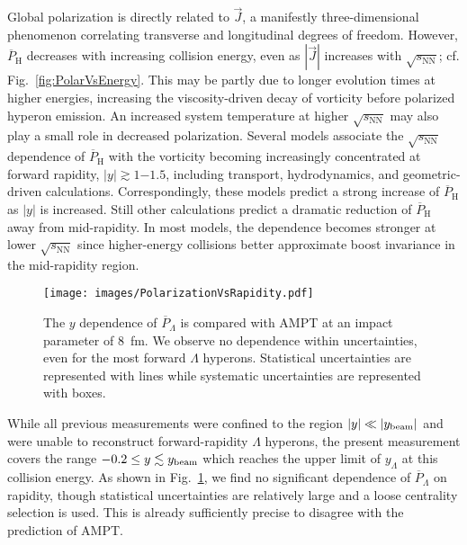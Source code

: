 \documentclass[
  reprint,
  superscriptaddress,
  amsmath,
  amssymb,
  aps,
  floatfix,
]{revtex4-2}
\newcommand{\sNN}{\sqrt{s_\mathrm{NN}}}
\newcommand{\Jsys}{\vec{J}}
\newcommand{\PLambda}{\overline{P}_{\Lambda}}
\newcommand{\PHyper}{\overline{P}_\mathrm{H}}
\begin{document}
Global polarization is directly related to
 $\Jsys$, a manifestly three-dimensional phenomenon correlating
 transverse and longitudinal degrees of freedom.
 However, $\PHyper$ decreases with increasing collision
 energy, even as $|\Jsys|$ increases with
 $\sNN$; cf. Fig.~\ref{fig:PolarVsEnergy}. This may be
 partly due to longer evolution times
 at higher energies, increasing the viscosity-driven
 decay of vorticity before polarized hyperon
 emission\cite{Karpenko:2017lyj}. An increased system temperature at
 higher $\sNN$ may also play a
 small role in decreased polarization\cite{Wang:2013xtp}. Several
 models associate the $\sNN$ dependence of
 $\PHyper$ with the vorticity becoming increasingly
 concentrated at forward rapidity, $|y|\gtrsim1\mathrm{-}1.5$, 
 including transport\cite{Jiang:2016woz},
 hydrodynamics\cite{Ivanov:2018eej,Wu:2019eyi,Ivanov:2019ern,Ivanov:2020wak},
 and geometric-driven calculations\cite{Liang:2019pst}. 
 Correspondingly, these
 models predict a strong increase of
 $\PHyper$ as $|y|$ is increased. Still
 other calculations predict a dramatic reduction
 of $\PHyper$ away from mid-rapidity\cite{Deng:2016gyh,Wei:2018zfb,Xie:2019jun}. In
 most models, the dependence becomes stronger
 at lower $\sNN$ since higher-energy collisions
 better approximate boost invariance in the
 mid-rapidity region. 

\begin{figure}[t]
  \centering
  \texttt{[image: images/PolarizationVsRapidity.pdf]}
  \caption{The $y$ dependence of $\PLambda$
 is compared with AMPT\cite{guo2021locating} at an
 impact parameter of 8~fm. We
 observe no dependence within uncertainties, even
 for the most forward $\Lambda$ hyperons.
 Statistical uncertainties are represented with lines
 while systematic uncertainties are represented with
 boxes.}
  \label{fig:y}
\end{figure}

While all previous measurements were confined
 to the region $|y|\ll|y_{\rm beam}|$ and
 were unable to reconstruct forward-rapidity $\Lambda$
 hyperons, the present measurement covers the
 range $-0.2\leq y\lesssim y_{\rm beam}$
 which reaches
 the upper limit of $y_\Lambda$ at
 this collision energy. As shown in
 Fig.~\ref{fig:y}, we find no significant dependence
 of $\PLambda$ on rapidity, though statistical
 uncertainties are relatively large and a
 loose centrality selection is used. This
 is already sufficiently precise to disagree
 with the prediction of AMPT.
\end{document}
